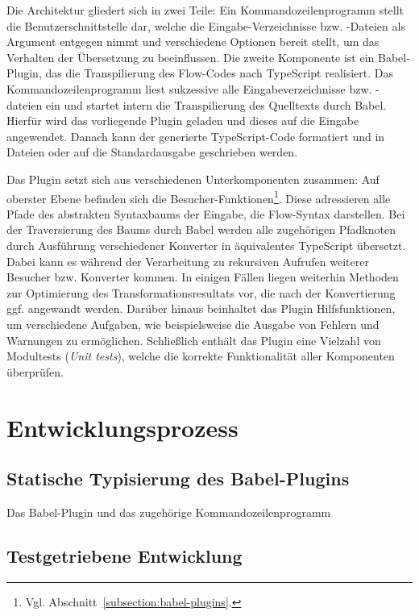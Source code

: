 Die Architektur gliedert sich in zwei Teile: Ein Kommandozeilenprogramm stellt die Benutzerschnittstelle dar, welche die Eingabe-Verzeichnisse bzw. -Dateien als Argument entgegen nimmt und verschiedene Optionen bereit stellt, um das Verhalten der Übersetzung zu beeinflussen. Die zweite Komponente ist ein Babel-Plugin, das die Transpilierung des Flow-Codes nach TypeScript realisiert. Das Kommandozeilenprogramm liest sukzessive alle Eingabeverzeichnisse bzw. -dateien ein und startet intern die Transpilierung des Quelltexts durch Babel. Hierfür wird das vorliegende Plugin geladen und dieses auf die Eingabe angewendet. Danach kann der generierte TypeScript-Code formatiert und in Dateien oder auf die Standardausgabe geschrieben werden.

Das Plugin setzt sich aus verschiedenen Unterkomponenten zusammen: Auf oberster Ebene befinden sich die Besucher-Funktionen\footnote{Vgl. Abschnitt~\ref{subsection:babel-plugins}.}. Diese adressieren alle Pfade des abstrakten Syntaxbaums der Eingabe, die Flow-Syntax darstellen. Bei der Traversierung des Baums durch Babel werden  alle zugehörigen Pfadknoten durch Ausführung verschiedener Konverter in äquivalentes TypeScript übersetzt. Dabei kann es während der Verarbeitung zu rekursiven Aufrufen weiterer Besucher bzw. Konverter kommen. In einigen Fällen liegen weiterhin Methoden zur Optimierung des Transformationsresultats vor, die nach der Konvertierung ggf. angewandt werden. Darüber hinaus beinhaltet das Plugin Hilfsfunktionen, um verschiedene Aufgaben, wie beispielsweise die Ausgabe von Fehlern und Warnungen zu ermöglichen. Schließlich enthält das Plugin eine Vielzahl von Modultests (\textit{Unit tests}), welche die korrekte Funktionalität aller Komponenten überprüfen.

\section{Entwicklungsprozess}

\subsection{Statische Typisierung des Babel-Plugins}

Das Babel-Plugin und das zugehörige Kommandozeilenprogramm

\subsection{Testgetriebene Entwicklung}

